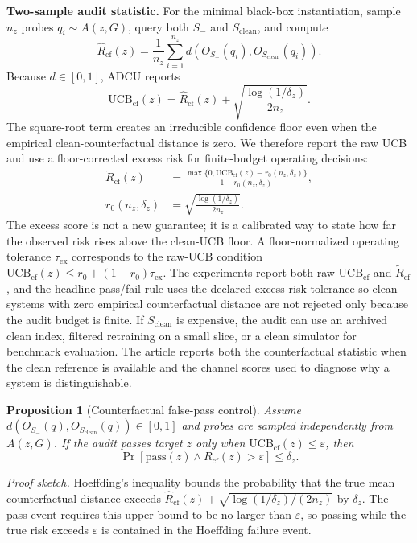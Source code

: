 \documentclass[10pt,journal,compsoc]{IEEEtran}
\newtheorem{proposition}{Proposition}
\newcommand{\method}{ADCU}
\begin{document}
\textbf{Two-sample audit statistic.}
For the minimal black-box instantiation, sample $n_z$ probes $q_i\sim A(z,G)$, query both $S_-$ and $S_{\mathrm{clean}}$, and compute
\[
\hat R_{\mathrm{cf}}(z)=\frac{1}{n_z}\sum_{i=1}^{n_z}
d(O_{S_-}(q_i),O_{S_{\mathrm{clean}}}(q_i)).
\]
Because $d\in[0,1]$, \method{} reports
\[
\mathrm{UCB}_{\mathrm{cf}}(z)=\hat R_{\mathrm{cf}}(z)+
\sqrt{\frac{\log(1/\delta_z)}{2n_z}}.
\]
The square-root term creates an irreducible confidence floor even when the empirical clean-counterfactual distance is zero. We therefore report the raw UCB and use a floor-corrected excess risk for finite-budget operating decisions:
\begin{align}
\widetilde R_{\mathrm{cf}}(z)&=
\frac{\max\{0,\mathrm{UCB}_{\mathrm{cf}}(z)-r_0(n_z,\delta_z)\}}
{1-r_0(n_z,\delta_z)}, \nonumber\\
r_0(n_z,\delta_z)&=\sqrt{\frac{\log(1/\delta_z)}{2n_z}}. \nonumber
\end{align}
The excess score is not a new guarantee; it is a calibrated way to state how far the observed risk rises above the clean-UCB floor. A floor-normalized operating tolerance $\tau_{\mathrm{ex}}$ corresponds to the raw-UCB condition $\mathrm{UCB}_{\mathrm{cf}}(z)\leq r_0+(1-r_0)\tau_{\mathrm{ex}}$. The experiments report both raw $\mathrm{UCB}_{\mathrm{cf}}$ and $\widetilde R_{\mathrm{cf}}$, and the headline pass/fail rule uses the declared excess-risk tolerance so clean systems with zero empirical counterfactual distance are not rejected only because the audit budget is finite. If $S_{\mathrm{clean}}$ is expensive, the audit can use an archived clean index, filtered retraining on a small slice, or a clean simulator for benchmark evaluation. The article reports both the counterfactual statistic when the clean reference is available and the channel scores used to diagnose why a system is distinguishable.

\begin{proposition}[Counterfactual false-pass control]
Assume $d(O_{S_-}(q),O_{S_{\mathrm{clean}}}(q))\in[0,1]$ and probes are sampled independently from $A(z,G)$. If the audit passes target $z$ only when $\mathrm{UCB}_{\mathrm{cf}}(z)\leq\varepsilon$, then
\[
\Pr[\mathrm{pass}(z)\wedge R_{\mathrm{cf}}(z)>\varepsilon]\leq \delta_z .
\]
\end{proposition}

\textit{Proof sketch.}
Hoeffding's inequality bounds the probability that the true mean counterfactual distance exceeds $\hat R_{\mathrm{cf}}(z)+\sqrt{\log(1/\delta_z)/(2n_z)}$ by $\delta_z$. The pass event requires this upper bound to be no larger than $\varepsilon$, so passing while the true risk exceeds $\varepsilon$ is contained in the Hoeffding failure event.
\end{document}
